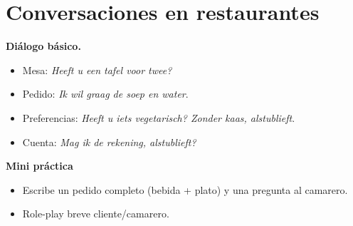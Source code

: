 \section{Conversaciones en restaurantes}
\textbf{Diálogo básico.}
\begin{itemize}[leftmargin=*]
  \item Mesa: \textit{Heeft u een tafel voor twee?}
  \item Pedido: \textit{Ik wil graag de soep en water}.
  \item Preferencias: \textit{Heeft u iets vegetarisch? Zonder kaas, alstublieft}.
  \item Cuenta: \textit{Mag ik de rekening, alstublieft?}
\end{itemize}

\textbf{Mini práctica}
\begin{itemize}[leftmargin=*]
  \item Escribe un pedido completo (bebida + plato) y una pregunta al camarero.
  \item Role-play breve cliente/camarero.
\end{itemize}
